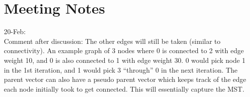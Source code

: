 \documentclass[11pt]{article}
\begin{document}
\section{Meeting Notes}
20-Feb:
\\
Comment after discussion: The other edges will still be taken (similar to connectivity). An example graph of 3 nodes where 0 is connected to 2 with edge weight 10, and 0 is also connected to 1 with edge weight 30. 0 would pick node 1 in the 1st iteration, and 1 would pick 3 ``through'' 0 in the next iteration.
The parent vector can also have a pseudo parent vector which keeps track of the edge each node initially took to get connected. This will essentially capture the MST.
\end{document}
